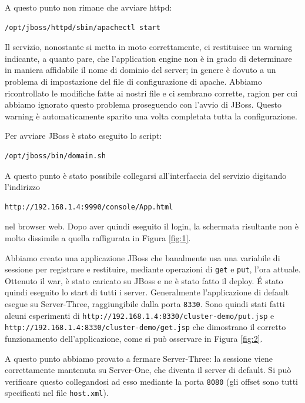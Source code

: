 \documentclass[twoside]{article}
\begin{document}
A questo punto non rimane che avviare httpd:
\begin{lstlisting}[frame=trBL]
/opt/jboss/httpd/sbin/apachectl start
\end{lstlisting}

Il servizio, nonostante si metta in moto correttamente, ci restituisce un warning indicante, a quanto pare,
che l'application engine non è in grado di determinare in maniera affidabile il nome di dominio del server;
in genere è dovuto a un problema di impostazione del file di configurazione di apache. Abbiamo ricontrollato
le modifiche fatte ai nostri file e ci sembrano corrette, ragion per cui abbiamo ignorato questo problema
proseguendo con l'avvio di JBoss. Questo warning è automaticamente sparito una volta completata
tutta la configurazione.

Per avviare JBoss è stato eseguito lo script:
\begin{lstlisting}[frame=trBL]
/opt/jboss/bin/domain.sh
\end{lstlisting}

A questo punto è stato possibile collegarsi all'interfaccia del servizio digitando l'indirizzo
\begin{lstlisting}[frame=trBL]
http://192.168.1.4:9990/console/App.html
\end{lstlisting}
nel browser web. Dopo aver quindi eseguito il login, la
schermata risultante non è molto dissimile a quella raffigurata in Figura \ref{fig:1}.

Abbiamo creato una applicazione JBoss che banalmente usa una variabile di sessione per registrare
e restituire, mediante operazioni di \texttt{get} e \texttt{put}, l'ora attuale. Ottenuto il war,
è stato caricato su JBoss e ne è stato fatto il deploy. \'{E} stato quindi eseguito lo start di
tutti i server. Generalmente l'applicazione di default esegue su Server-Three, raggiungibile dalla
porta \texttt{8330}. Sono quindi stati fatti alcuni esperimenti di 
\texttt{http://192.168.1.4:8330/cluster-demo/put.jsp} e 
\texttt{http://192.168.1.4:8330/cluster-demo/get.jsp} che dimostrano il corretto funzionamento
dell'applicazione, come si può osservare in Figura \ref{fig:2}.

A questo punto abbiamo provato a fermare Server-Three: la sessione viene correttamente mantenuta
su Server-One, che diventa il server di default. Si può verificare questo collegandosi ad esso
mediante la porta \texttt{8080} (gli offset sono tutti specificati nel file \texttt{host.xml}).
\end{document}
